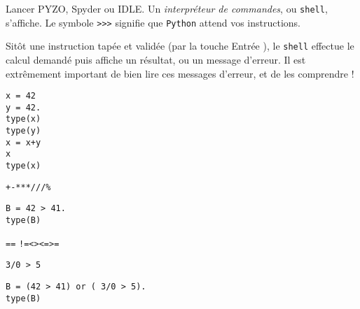 

Lancer PYZO, Spyder ou IDLE. Un \emph{interpréteur de commandes}, ou \texttt{shell}, s'affiche. 
Le symbole \texttt{>}\texttt{>}\texttt{>} signifie que \texttt{Python}{} attend vos instructions. 

Sitôt une instruction tapée et validée (par la touche \og Entrée \fg{}), le \texttt{shell} effectue le calcul demandé puis affiche un résultat, ou un message d'erreur. 
Il est extrêmement important de bien lire ces messages d'erreur, et de les comprendre ! 


\begin{lstlisting}
x = 42
y = 42.
type(x)
type(y)
x = x+y
x
type(x)
\end{lstlisting}



\begin{center}
  \texttt{+}\qquad \texttt{-}\qquad \texttt{*}\qquad \texttt{**}\qquad \texttt{/}\qquad \texttt{//}\qquad \texttt{\%}
\end{center}


\begin{lstlisting}
B = 42 > 41.
type(B)
\end{lstlisting}



\begin{center}
  \texttt{==} {} \qquad{} \texttt{!=}\qquad\texttt{<}\qquad\texttt{>}\qquad\texttt{<=}\qquad\texttt{>=}
\end{center}


\begin{lstlisting}
3/0 > 5
\end{lstlisting}


\begin{lstlisting}
B = (42 > 41) or ( 3/0 > 5).
type(B)
\end{lstlisting}


